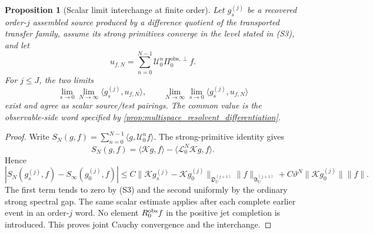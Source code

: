 \documentclass[11pt]{amsart}
\theoremstyle{compactplain}
\newtheorem*{proposition*}{Proposition}
\theoremstyle{compactdefinition}
\theoremstyle{compactremark}
\newcommand{\Ltransfer}{\mathscr L}
\newcommand{\Piobsperp}{\Pi^{\mathrm{obs},\perp}}
\begin{document}
\begin{proposition*}[Scalar limit interchange at finite order]
Let \(g_s^{(j)}\) be a recovered order-\(j\) assembled source produced by a
difference quotient of the transported transfer family, assume its strong
primitives converge in the level stated in (S3), and let
\[
  u_{f,N}=\sum_{n=0}^{N-1}\mathscr U_0^n\Piobsperp_0 f.
\]
For \(j\le J\), the two limits
\[
  \lim_{s\to0}\lim_{N\to\infty}
  \langle g_s^{(j)},u_{f,N}\rangle,
  \qquad
  \lim_{N\to\infty}\lim_{s\to0}
  \langle g_s^{(j)},u_{f,N}\rangle
\]
exist and agree as scalar source/test pairings.  The common value is the
observable-side word specified by
\cref{prop:multispace_resolvent_differentiation}.
\end{proposition*}

\begin{proof}
Write
\(S_N(g,f)=\sum_{n=0}^{N-1}\langle g,\mathscr U_0^nf\rangle\).
The strong-primitive identity gives
\[
 S_N(g,f)=\langle\mathcal K g,f\rangle
 -\langle\Ltransfer_0^N\mathcal K g,f\rangle .
\]
Hence
\[
 |S_N(g_s^{(j)},f)-S_\infty(g_0^{(j)},f)|
 \le C\|\mathcal K g_s^{(j)}-\mathcal K g_0^{(j)}\|_{\mathfrak D_U^{(j+1)}}
      \|f\|_{\mathfrak A_U^{(j+1)}}
 +C\vartheta^N\|\mathcal K g_0^{(j)}\|\|f\|.
\]
The first term tends to zero by (S3) and the second uniformly by the ordinary
strong spectral gap.  The same scalar estimate applies after each complete
earlier event in an order-\(j\) word.  No element
\(R_0^{\rm obs}f\) in the positive jet completion is introduced.  This proves
joint Cauchy convergence and the interchange.
\end{proof}
\end{document}
